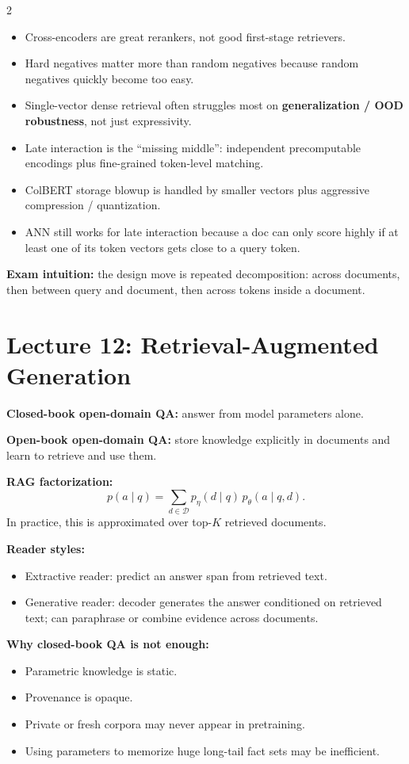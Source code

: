 \documentclass[10pt]{article}
\begin{document}
\begin{multicols*}{2}
\begin{itemize}
\item Cross-encoders are great rerankers, not good first-stage retrievers.
\item Hard negatives matter more than random negatives because random negatives quickly become too easy.
\item Single-vector dense retrieval often struggles most on \textbf{generalization / OOD robustness}, not just expressivity.
\item Late interaction is the ``missing middle'': independent precomputable encodings plus fine-grained token-level matching.
\item ColBERT storage blowup is handled by smaller vectors plus aggressive compression / quantization.
\item ANN still works for late interaction because a doc can only score highly if at least one of its token vectors gets close to a query token.
\end{itemize}

\textbf{Exam intuition:} the design move is repeated decomposition: across documents, then between query and document, then across tokens inside a document.

\section*{Lecture 12: Retrieval-Augmented Generation}
\textbf{Closed-book open-domain QA:}
answer from model parameters alone.

\textbf{Open-book open-domain QA:}
store knowledge explicitly in documents and learn to retrieve and use them.

\textbf{RAG factorization:}
\[
p(a \mid q)
=
\sum_{d \in \mathcal{D}}
p_\eta(d \mid q)\, p_\theta(a \mid q,d).
\]
In practice, this is approximated over top-\(K\) retrieved documents.

\textbf{Reader styles:}
\begin{itemize}
\item Extractive reader: predict an answer span from retrieved text.
\item Generative reader: decoder generates the answer conditioned on retrieved text; can paraphrase or combine evidence across documents.
\end{itemize}

\textbf{Why closed-book QA is not enough:}
\begin{itemize}
\item Parametric knowledge is static.
\item Provenance is opaque.
\item Private or fresh corpora may never appear in pretraining.
\item Using parameters to memorize huge long-tail fact sets may be inefficient.
\end{itemize}


\end{multicols*}
\end{document}
